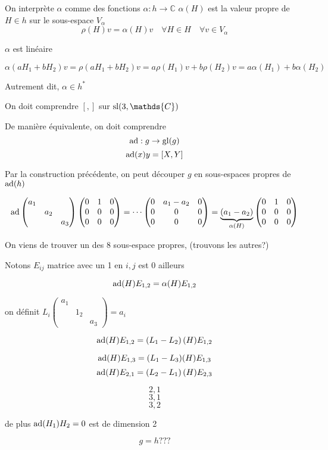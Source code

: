 On interprète \(\alpha\) comme des fonctions \(\alpha: h \to \mathds{C}\)
\(\alpha(H)\) est la valeur propre de \(H \in h\) sur le sous-espace \(V_\alpha\) 
\[ \rho(H) v = \alpha(H) v\quad \forall H \in H \quad \forall v \in V_\alpha \]


\(\alpha\) est linéaire

\[ \alpha(a H_1 + b H_2) v = \rho(a H_1 + b H_2 ) v = a \rho ( H_1 ) v + b \rho( H_2 ) v = a \alpha(H_1) + b \alpha(H_2 )  \]

Autrement dit, \(\alpha \in h^{*}\)



On doit comprendre \( [{}, {}] \) sur \({\rm{}sl}(3, \mathds{C})\)

De manière équivalente, on doit comprendre
\[ {\rm{}ad}: g \to {\rm{}gl}(g) \]
\[ {\rm{}ad}(x) y = [X, Y]  \]

Par la construction précédente, on peut découper \(g\) en sous-espaces propres de \({\rm{}ad}(h)\)

\[ {\rm{}ad} \begin{pmatrix} a_1 \\ & a_2 \\ && a_3 \end{pmatrix} \begin{pmatrix} 0 & 1 &0\\0&0&0\\0&0&0 \end{pmatrix} =  \dotsb \begin{pmatrix} 0& a_1 -a_2 &0 \\ 0 &0&0\\0&0&0 \end{pmatrix} = \underbrace{\left( a_1 -a_2  \right)}_{\alpha(H)}  \begin{pmatrix} 0 & 1 &0 \\0&0&0\\0&0&0 \end{pmatrix}  \]

On viens de trouver un des 8 sous-espace propres, (trouvons les autres?)

Notons \(E_{ij} \) matrice avec un 1 en \(i,j\) est 0 ailleurs 

\[ {\rm{}ad}(H) E_{1,2} = \alpha(H) E_{1,2}  \]

on définit \(L_i \begin{pmatrix} a_1 \\ & 1_2 \\ &&a_3 \end{pmatrix}  =a_i\)

\[ {\rm{}ad}(H) E_{1,2} = \left( L_1 - L_2 \right) (H) E_{1,2}  \]

\[ {\rm{}ad}(H) E_{1,3} = (L_1 - L_3) (H) E_{1,3}  \]
\[ {\rm{}ad}(H) E_{2,1} = \left( L_2 - L_1 \right) (H) E_{2,3}  \]

\[ 2,1 \]
\[ 3,1 \]
\[ 3,2 \]

de plus \({\rm{}ad}(H_1) H_2 = 0\) est de dimension 2


\[ g = h ??? \]






